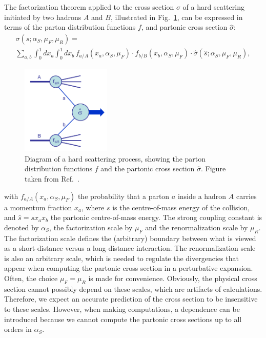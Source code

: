 The factorization theorem applied to the cross section $\sigma$ of a hard scattering initiated by
two hadrons $A$ and $B$, illustrated in Fig.~\ref{fig:event_hard_scatter},
can be expressed in terms of the parton distribution functions $f$, and partonic cross section
$\hat{\sigma}$:
\begin{multline}
  \sigma(s;\alpha_S,\mu_F,\mu_R) = \\ 
  \sum_{a,b} \int_0^1 dx_a \int_0^1 dx_b \,  f_{a/A}(x_a, \alpha_S, \mu_F) \cdot f_{b/B}(x_b,
\alpha_S, \mu_F) \cdot \hat{\sigma}(\hat{s};\alpha_S,\mu_F,\mu_R),
\label{eq:factorization_theorem} 
\end{multline}
 \begin{figure}
  \centering
  \vspace{-1eM}
  \includegraphics[width=0.38\textwidth]{figures/eventreco_event/Hardscattering}
  \caption{Diagram of a hard scattering process, showing the parton distribution functions
$f$ and the partonic cross section $\hat{\sigma}$. Figure taken from Ref.~\cite{Campbell:2006wx}.
  \label{fig:event_hard_scatter}}
\end{figure}
with $f_{a/A}(x_a, \alpha_S, \mu_F)$ the probability that a parton $a$ inside
a hadron $A$ carries a momentum fraction $x_a$, where $s$ is the centre-of-mass energy of the
collision, and $\hat{s} = s x_a x_b$ the partonic centre-of-mass energy.
The strong coupling constant is denoted by $\alpha_S$, the factorization scale by $\mu_F$ and the
 renormalization scale by $\mu_R$.
The factorization scale defines the (arbitrary) boundary between what is viewed as a short-distance
versus a long-distance interaction. The renormalization scale is also an arbitrary scale, which is
needed to regulate the divergencies that appear when computing the partonic cross section in a
perturbative expansion. 
Often, the choice $\mu_F = \mu_R$ is made for convenience.
Obviously, the physical cross section cannot possibly depend on these scales, which are artifacts of
calculations. Therefore, we expect an accurate prediction of the cross section to be insensitive to
these scales. However, when making computations,
a dependence can be introduced because we cannot
compute the partonic cross sections up to all orders in $\alpha_S$. 

